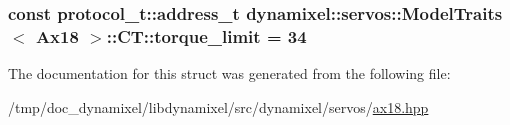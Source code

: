 \subsubsection[{\texorpdfstring{torque\+\_\+limit}{torque_limit}}]{\setlength{\rightskip}{0pt plus 5cm}const {\bf protocol\+\_\+t\+::address\+\_\+t} {\bf dynamixel\+::servos\+::\+Model\+Traits}$<$ {\bf Ax18} $>$\+::C\+T\+::torque\+\_\+limit = 34\hspace{0.3cm}{\ttfamily [static]}}\hypertarget{structdynamixel_1_1servos_1_1_model_traits_3_01_ax18_01_4_1_1_c_t_adc924944d89e2ce6f0194625d2d8d99d}{}\label{structdynamixel_1_1servos_1_1_model_traits_3_01_ax18_01_4_1_1_c_t_adc924944d89e2ce6f0194625d2d8d99d}


The documentation for this struct was generated from the following file\+:\begin{DoxyCompactItemize}
\item 
/tmp/doc\+\_\+dynamixel/libdynamixel/src/dynamixel/servos/\hyperlink{ax18_8hpp}{ax18.\+hpp}\end{DoxyCompactItemize}

